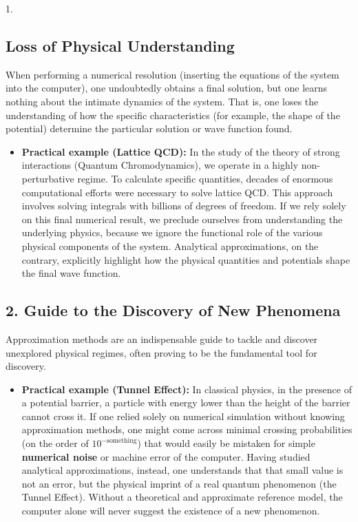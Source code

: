 1. \subsection{Loss of Physical Understanding
}
When performing a numerical resolution (inserting the equations of the system into the computer), one undoubtedly obtains a final solution, but one learns nothing about the intimate dynamics of the system. That is, one loses the understanding of how the specific characteristics (for example, the shape of the potential) determine the particular solution or wave function found.
\begin{itemize}
\item \textbf{Practical example (Lattice QCD):} In the study of the theory of strong interactions (Quantum Chromodynamics), we operate in a highly non-perturbative regime. To calculate specific quantities, decades of enormous computational efforts were necessary to solve lattice QCD. This approach involves solving integrals with billions of degrees of freedom. If we rely solely on this final numerical result, we preclude ourselves from understanding the underlying physics, because we ignore the functional role of the various physical components of the system. Analytical approximations, on the contrary, explicitly highlight how the physical quantities and potentials shape the final wave function.
\end{itemize}

\subsection{2. Guide to the Discovery of New Phenomena}
Approximation methods are an indispensable guide to tackle and discover unexplored physical regimes, often proving to be the fundamental tool for discovery.
\begin{itemize}
\item \textbf{Practical example (Tunnel Effect):} In classical physics, in the presence of a potential barrier, a particle with energy lower than the height of the barrier cannot cross it. If one relied solely on numerical simulation without knowing approximation methods, one might come across minimal crossing probabilities (on the order of $10^{-\text{something}}$) that would easily be mistaken for simple \textbf{numerical noise} or machine error of the computer. Having studied analytical approximations, instead, one understands that that small value is not an error, but the physical imprint of a real quantum phenomenon (the Tunnel Effect). Without a theoretical and approximate reference model, the computer alone will never suggest the existence of a new phenomenon.
\end{itemize}

